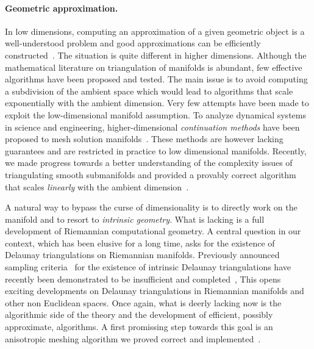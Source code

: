 \paragraph{Geometric approximation.}
In low dimensions, computing an approximation of a given geometric object is a well-understood problem and good approximations can be efficiently constructed~\cite{geometrica-bcmrv-ms-06,he-gtmg-2001}.  The situation is quite different in higher dimensions.  Although the mathematical literature on triangulation of manifolds is abundant, few effective algorithms have been proposed and tested.  The main issue is to avoid computing a subdivision of the ambient space which would lead to algorithms that scale exponentially with the ambient dimension. Very few attempts have been made to exploit the  low-dimensional manifold assumption.
To analyze {dynamical systems} in science and engineering, higher-dimensional {\em continuation methods} have been proposed to mesh solution manifolds~\cite{mh-mpc-2002}. These methods are however lacking guarantees and are restricted in practice to low dimensional manifolds. 
Recently, we made progress towards a better understanding of the complexity issues of triangulating smooth submanifolds and provided a provably correct algorithm that scales {\em linearly} with the ambient dimension~\cite{boissonnat2010meshing}. 

A natural way to bypass the curse of dimensionality is to directly work on the manifold and to resort to {\em intrinsic geometry}. What is lacking is a full development of Riemannian computational geometry. A central question in our context, which has been elusive for a long time, asks for the existence of Delaunay triangulations on Riemannian manifolds. Previously announced sampling criteria~\cite{leibon2000} for the existence of intrinsic Delaunay triangulations have recently been demonstrated to be insufficient and completed~\cite{boissonnat2012stab}, 
This opens exciting developments on Delaunay triangulations in Riemannian manifolds and other non Euclidean spaces. Once again, what is deerly lacking now is the algorithmic side of the theory and the development of efficient, possibly approximate,  algorithms.  A first promissing step towards this goal is an anisotropic meshing algorithm  we proved correct and implemented~\cite{bwy-luam-08}.

